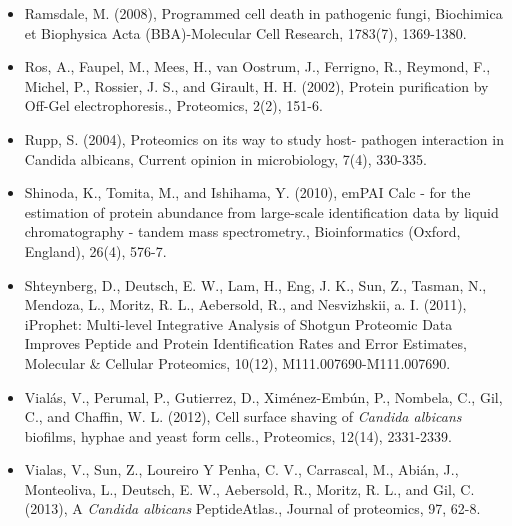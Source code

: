 \begin{itemize}[leftmargin=*]
\item[]{%
Ramsdale, M. (2008), Programmed cell death in pathogenic fungi, Biochimica et Biophysica
Acta (BBA)-Molecular Cell Research, 1783(7), 1369-1380.
}


\item[]{%
Ros, A., Faupel, M., Mees, H., van Oostrum, J., Ferrigno, R., Reymond, F., Michel, P., Rossier,
J. S., and Girault, H. H. (2002), Protein purification by Off-Gel electrophoresis., Proteomics,
2(2), 151-6.
}

\item[]{%
Rupp, S. (2004), Proteomics on its way to study host- pathogen interaction in Candida albicans,
 Current opinion in microbiology, 7(4), 330-335.
}

\item[]{%
Shinoda, K., Tomita, M., and Ishihama, Y. (2010), 
emPAI Calc - for the estimation of protein abundance from large-scale
identification data by liquid chromatography - tandem mass spectrometry.,
Bioinformatics (Oxford, England), 26(4), 576-7.
}

\item[]{%
Shteynberg, D., Deutsch, E. W., Lam, H., Eng, J. K., Sun, Z., Tasman, N., Mendoza, L., Moritz,
R. L., Aebersold, R., and Nesvizhskii, a. I. (2011), iProphet: Multi-level Integrative Analysis
of Shotgun Proteomic Data Improves Peptide and Protein Identification Rates and Error
Estimates, Molecular \& Cellular Proteomics, 10(12), M111.007690-M111.007690.
}


\item[]{%
Vial\'as, V., Perumal, P., Gutierrez, D., Xim\'enez-Emb\'un, P., Nombela, C., Gil, C., and Chaffin,
W. L. (2012), Cell surface shaving of \textit{Candida albicans} biofilms, hyphae and yeast form
cells., Proteomics, 12(14), 2331-2339.
}

\item[]{%
Vialas, V., Sun, Z., Loureiro Y Penha, C. V., Carrascal, M., Abi\'an, J., Monteoliva, L., Deutsch,
E. W., Aebersold, R., Moritz, R. L., and Gil, C. (2013), A \textit{Candida albicans} PeptideAtlas.,
Journal of proteomics, 97, 62-8.
}


\end{itemize}

